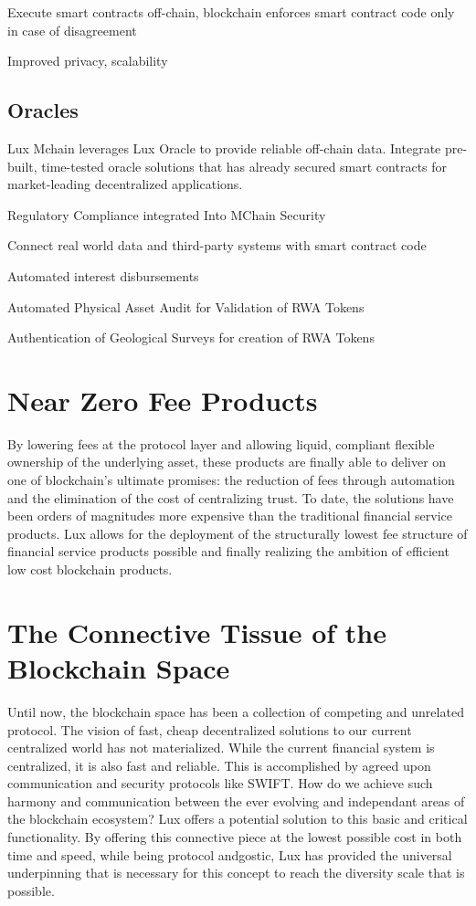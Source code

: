 \documentclass[11pt]{article}
\begin{document}
Execute smart contracts off-chain, blockchain enforces smart contract code only in case of disagreement


Improved privacy, scalability


\subsection{Oracles}

Lux Mchain leverages Lux Oracle to provide reliable off-chain data. Integrate pre-built, time-tested oracle solutions that has already secured smart contracts for market-leading decentralized applications.


Regulatory Compliance integrated Into MChain Security


Connect real world data and third-party systems with smart contract code


Automated interest disbursements


Automated Physical Asset Audit for Validation of RWA Tokens


Authentication of Geological Surveys for creation of RWA Tokens


\section{Near Zero Fee Products}

By lowering fees at the protocol layer and allowing liquid, compliant flexible ownership of the underlying asset, these products are finally able to deliver on one of blockchain's ultimate promises: the reduction of fees through automation and the elimination of the cost of centralizing trust. To date, the solutions have been orders of magnitudes more expensive than the traditional financial service products. Lux allows for the deployment of the structurally lowest fee structure of financial service products possible and finally realizing the ambition of efficient low cost blockchain products.


\section{The Connective Tissue of the Blockchain Space}

Until now, the blockchain space has been a collection of competing and unrelated protocol. The vision of fast, cheap decentralized solutions to our current centralized world has not materialized. While the current financial system is centralized, it is also fast and reliable. This is accomplished by agreed upon communication and security protocols like SWIFT. How do we achieve such harmony and communication between the ever evolving and independant areas of the blockchain ecosystem? Lux offers a potential solution to this basic and critical functionality. By offering this connective piece at the lowest possible cost in both time and speed, while being protocol andgostic, Lux has provided the universal underpinning that is necessary for this concept to reach the diversity scale that is possible.
\end{document}
